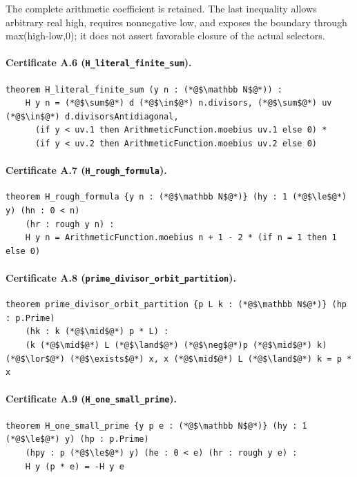 \documentclass[11pt,a4paper]{article}
\theoremstyle{definition}
\theoremstyle{remark}
\begin{document}
The complete arithmetic coefficient is retained. The last inequality allows arbitrary real high, requires nonnegative low, and exposes the boundary through max(high-low,0); it does not assert favorable closure of the actual selectors.

\paragraph{Certificate A.6 (\texttt{H\_literal\_finite\_sum}).}
\begin{lstlisting}
theorem H_literal_finite_sum (y n : (*@$\mathbb N$@*)) :
    H y n = (*@$\sum$@*) d (*@$\in$@*) n.divisors, (*@$\sum$@*) uv (*@$\in$@*) d.divisorsAntidiagonal,
      (if y < uv.1 then ArithmeticFunction.moebius uv.1 else 0) *
      (if y < uv.2 then ArithmeticFunction.moebius uv.2 else 0)
\end{lstlisting}

\paragraph{Certificate A.7 (\texttt{H\_rough\_formula}).}
\begin{lstlisting}
theorem H_rough_formula {y n : (*@$\mathbb N$@*)} (hy : 1 (*@$\le$@*) y) (hn : 0 < n)
    (hr : rough y n) :
    H y n = ArithmeticFunction.moebius n + 1 - 2 * (if n = 1 then 1 else 0)
\end{lstlisting}

\paragraph{Certificate A.8 (\texttt{prime\_divisor\_orbit\_partition}).}
\begin{lstlisting}
theorem prime_divisor_orbit_partition {p L k : (*@$\mathbb N$@*)} (hp : p.Prime)
    (hk : k (*@$\mid$@*) p * L) :
    (k (*@$\mid$@*) L (*@$\land$@*) (*@$\neg$@*)p (*@$\mid$@*) k) (*@$\lor$@*) (*@$\exists$@*) x, x (*@$\mid$@*) L (*@$\land$@*) k = p * x
\end{lstlisting}

\paragraph{Certificate A.9 (\texttt{H\_one\_small\_prime}).}
\begin{lstlisting}
theorem H_one_small_prime {y p e : (*@$\mathbb N$@*)} (hy : 1 (*@$\le$@*) y) (hp : p.Prime)
    (hpy : p (*@$\le$@*) y) (he : 0 < e) (hr : rough y e) :
    H y (p * e) = -H y e
\end{lstlisting}
\end{document}
